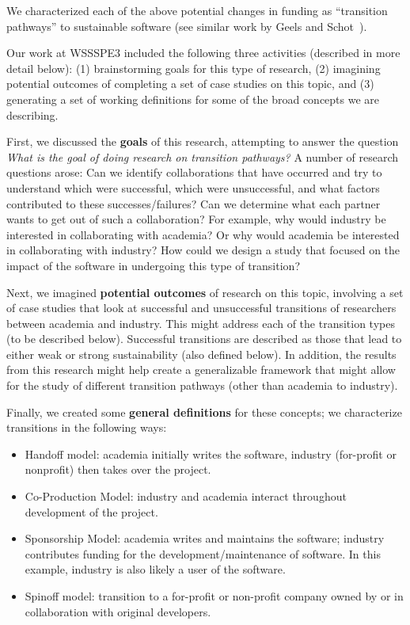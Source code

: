 We characterized each of the above potential changes in funding as ``transition
pathways'' to sustainable software (see similar work by Geels and
Schot~\cite{Geels:2007}).

Our work at WSSSPE3 included the following three activities (described in more detail
below): (1) brainstorming goals for this type of research, (2) imagining
potential outcomes of completing a set of case studies on this topic, and (3)
generating a set of working definitions for some of the broad concepts we are
describing.

First, we discussed the \textbf{goals} of this research, attempting to answer the 
question \emph{What is the goal of doing research on transition pathways?}
A number of research questions arose:  Can we identify collaborations that have 
occurred and try to understand which were successful, which were unsuccessful, 
and what factors contributed to these successes/failures? Can we determine what 
each partner wants to get out of such a collaboration? For example, why would 
industry be interested in collaborating with academia? Or why would academia 
be interested in collaborating with industry? How could we design a study that 
focused on the impact of the software in undergoing this type of transition?

Next, we imagined \textbf{potential outcomes} of research on this topic, involving 
a set of case studies that look at successful and unsuccessful
transitions of researchers between academia and industry. This might address 
each of the transition types (to be described below). Successful transitions are
described as those that lead to either weak or strong sustainability (also
defined below). In addition, the results from this research might help create a 
generalizable framework that might allow for the study of different transition 
pathways (other than academia to industry).

Finally, we created some \textbf{general definitions} for these concepts; we 
characterize transitions in the following ways:
\begin{itemize}

\item Handoff model: academia initially writes the software, industry (for-profit 
or nonprofit) then takes over the project.

\item Co-Production Model: industry and academia interact throughout development
of the project.

\item Sponsorship Model: academia writes and maintains the software; 
industry contributes funding for the development\slash maintenance of software.
In this example, industry is also likely a user of the software.

\item Spinoff model: transition to a for-profit or non-profit company owned by or in
collaboration with original developers.

\end{itemize}

